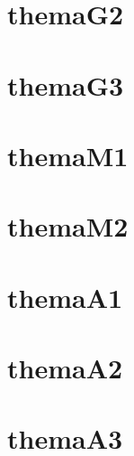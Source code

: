 \documentclass[nocrop]{sesamanuel}
\begin{document}
\chapter{themaG2}
\chapter{themaG3}

\themaM
\chapter{themaM1}
\chapter{themaM2}

\themaA
\chapter{themaA1}
\chapter{themaA2}
\chapter{themaA3}


%
%
\end{document}
